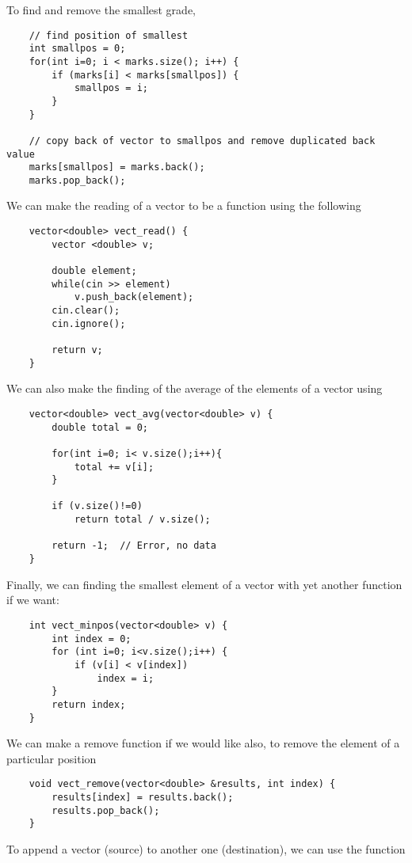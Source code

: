 \documentclass[]{article}
\begin{document}
To find and remove the smallest grade,

\begin{lstlisting}
	// find position of smallest
	int smallpos = 0;
	for(int i=0; i < marks.size(); i++) {
		if (marks[i] < marks[smallpos]) {
			smallpos = i;
		}
	}
	
	// copy back of vector to smallpos and remove duplicated back value
	marks[smallpos] = marks.back();
	marks.pop_back();
\end{lstlisting}\bigbreak


We can make the reading of a vector to be a function using the following

\begin{lstlisting}
	vector<double> vect_read() {
		vector <double> v;
		
		double element;
		while(cin >> element)
			v.push_back(element);
		cin.clear();
		cin.ignore();
		
		return v;
	}
\end{lstlisting}\bigbreak

We can also make the finding of the average of the elements of a vector using

\begin{lstlisting}
	vector<double> vect_avg(vector<double> v) {
		double total = 0;
		
		for(int i=0; i< v.size();i++){
			total += v[i];
		}
	
		if (v.size()!=0)
			return total / v.size();
		
		return -1;  // Error, no data
	}
\end{lstlisting}\bigbreak


Finally, we can finding the smallest element of a vector with yet another function if we want:

\begin{lstlisting}
	int vect_minpos(vector<double> v) {
		int index = 0;
		for (int i=0; i<v.size();i++) {
			if (v[i] < v[index])
				index = i;
		}
		return index;
	}
\end{lstlisting}\bigbreak

We can make a remove function if we would like also, to remove the element of a particular position

\begin{lstlisting}
	void vect_remove(vector<double> &results, int index) {
		results[index] = results.back();
		results.pop_back();
	}
\end{lstlisting}\bigbreak


To append a vector (source) to another one (destination), we can use the function
\end{document}

